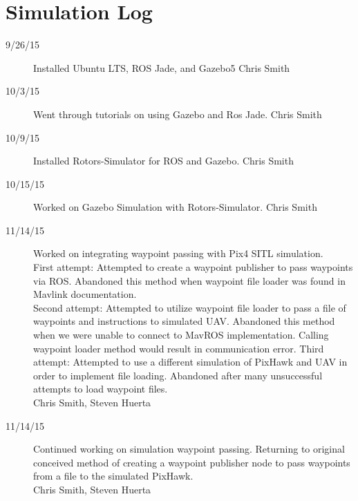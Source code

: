 \section{Simulation Log}

\begin{description}
\item [9/26/15]  Installed Ubuntu LTS, ROS Jade, and Gazebo5 \hfill{Chris Smith}
\item [10/3/15] Went through tutorials on using Gazebo and Ros Jade. \hfill{Chris Smith}
\item [10/9/15] Installed Rotors-Simulator for ROS and Gazebo. \hfill{Chris Smith}
\item [10/15/15] Worked on Gazebo Simulation with Rotors-Simulator. \hfill{Chris Smith}
\item [11/14/15] Worked on integrating waypoint passing with Pix4 SITL simulation.\\
First attempt: Attempted to create a waypoint publisher to pass waypoints via ROS. Abandoned this method when waypoint file loader was found in Mavlink documentation.\\
Second attempt: Attempted to utilize waypoint file loader to pass a file of waypoints and instructions to simulated UAV. Abandoned this method when we were unable to connect to MavROS implementation. Calling waypoint loader method would result in communication error.
Third attempt: Attempted to use a different simulation of PixHawk and UAV in order to implement file loading. Abandoned after many unsuccessful attempts to load waypoint files.\\

\hfill{Chris Smith, Steven Huerta}

\item [11/14/15] Continued working on simulation waypoint passing. Returning to original conceived method of creating a waypoint publisher node to pass waypoints from a file to the simulated PixHawk.\\

\hfill{Chris Smith, Steven Huerta}
\end{description}